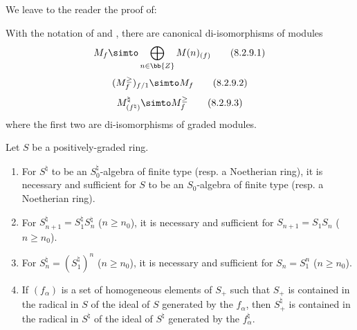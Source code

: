 We leave to the reader the proof of:
\begin{lemma}[8.2.9]
\label{II.8.2.9}
With the notation of  and , there are canonical di-isomorphisms of modules
\[
\label{II.8.2.9.1}
  M_f \simto \bigoplus_{n\in\bb{Z}} M(n)_{(f)}
\tag{8.2.9.1}
\]
\[
\label{II.8.2.9.2}
  (M_f^\geq)_{f/1} \simto M_f
\tag{8.2.9.2}
\]
\[
\label{II.8.2.9.3}
  M_{(f^\natural)}^\natural \simto M_f^\geq
\tag{8.2.9.3}
\]
where the first two are di-isomorphisms of graded modules.
\end{lemma}

\begin{lemma}[8.2.10]
\label{II.8.2.10}
Let $S$ be a positively-graded ring.
\begin{enumerate}
  \item[\rm{(i)}] For $S^\natural$ to be an $S_0^\natural$-algebra of finite type (resp. a Noetherian ring), it is necessary and sufficient for $S$ to be an $S_0$-algebra of finite type (resp. a Noetherian ring).
  \item[\rm{(ii)}] For $S_{n+1}^\natural = S_1^\natural S_n^\natural$ ($n\geq n_0$), it is necessary and sufficient for $S_{n+1}=S_1S_n$ ($n\geq n_0$).
  \item[\rm{(iii)}] For $S_n^\natural = (S_1^\natural)^n$ ($n\geq n_0$), it is necessary and sufficient for $S_n=S_1^n$ ($n\geq n_0$).
  \item[\rm{(iv)}] If $(f_\alpha)$ is a set of homogeneous elements of $S_+$ such that $S_+$ is contained in the radical in $S$ of the ideal of $S$ generated by the $f_\alpha$, then $S_+^\natural$ is contained in the radical in $S^\natural$ of the ideal of $S^\natural$ generated by the $f_\alpha^\natural$.
\end{enumerate}
\end{lemma}

